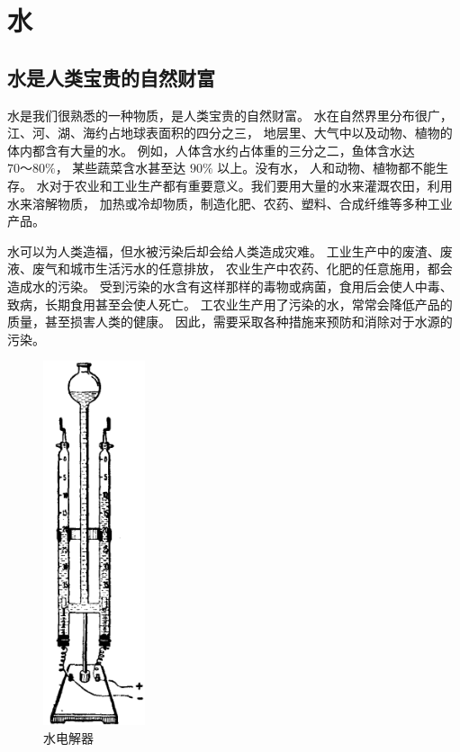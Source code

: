 \section{水}\label{sec:2-1}

\subsection{水是人类宝贵的自然财富}

水是我们很熟悉的一种物质，是人类宝贵的自然财富。
水在自然界里分布很广，江、河、湖、海约占地球表面积的四分之三，
地层里、大气中以及动物、植物的体内都含有大量的水。
例如，人体含水约占体重的三分之二，鱼体含水达 $70 \text{～} 80\%$，
某些蔬菜含水甚至达 $90\%$ 以上。没有水， 人和动物、植物都不能生存。
水对于农业和工业生产都有重要意义。我们要用大量的水来灌溉农田，利用水来溶解物质，
加热或冷却物质，制造化肥、农药、塑料、合成纤维等多种工业产品。

水可以为人类造福，但水被污染后却会给人类造成灾难。
工业生产中的废渣、废液、废气和城市生活污水的任意排放，
农业生产中农药、化肥的任意施用，都会造成水的污染。
受到污染的水含有这样那样的毒物或病菌，食用后会使人中毒、致病，长期食用甚至会使人死亡。
工农业生产用了污染的水，常常会降低产品的质量，甚至损害人类的健康。
因此，需要采取各种措施来预防和消除对于水源的污染。

\begin{figure}
    \centering
    \includegraphics[width=3cm]{../pic/czhx1-ch2-1}
    \caption{水电解器}\label{fig:2-1}
\end{figure}


